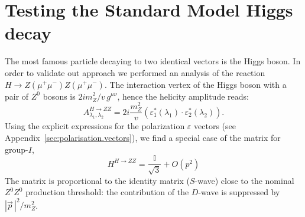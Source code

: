 \documentclass[prd,preprintnumbers,floatfix,
nofootinbib,superscriptaddress]{revtex4}
\newcommand{\I}{\ensuremath{I}}
\begin{document}
\section{Testing the Standard Model Higgs decay} \label{sec:higgs}
The most famous particle decaying to two identical vectors is the Higgs boson.
In order to validate out approach we performed an analysis of the reaction $H\to Z(\mu^+\mu^-)Z(\mu^+\mu^-)$.
The interaction vertex of the Higgs boson with a pair of $Z^0$ bosons is $2i m_Z^2/v\,g^{\mu\nu}$,
hence the helicity amplitude reads:
\begin{equation} \label{eq:HZZ}
  A^{H\to ZZ}_{\lambda_1,\lambda_2} = 2i\frac{m_Z^2}{v} (\varepsilon_1^*(\lambda_1)\cdot\varepsilon_2^*(\lambda_2)).
\end{equation}
Using the explicit expressions for the polarization $\varepsilon$ vectors (see Appendix~\ref{sec:polarisation.vectors}), we find a special case of the matrix for group-$\I$,
\begin{equation} \label{eq:H2ZZ}
  H^{H\to ZZ} = \frac{\mathbb{I}}{\sqrt{3}} + O(p^2)
\end{equation}
The matrix is proportional to the identity matrix ($S$-wave) close to the nominal $Z^0Z^0$ production threshold:
the contribution of the $D$-wave is suppressed by $|\vec p\,|^2/m_Z^2$.
\end{document}
